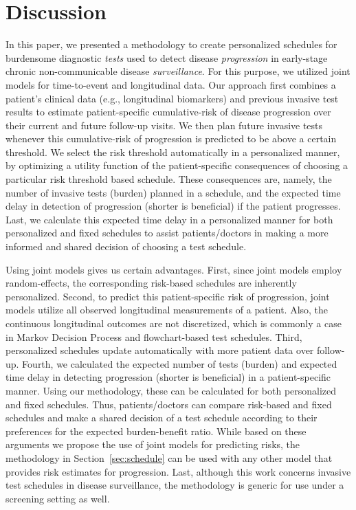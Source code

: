 \documentclass[AMA,STIX1COL]{WileyNJD-v2}
\begin{document}
\section{Discussion}
\label{sec:discussion}
In this paper, we presented a methodology to create personalized schedules for burdensome diagnostic \textit{tests} used to detect disease \textit{progression} in early-stage chronic non-communicable disease \textit{surveillance}. For this purpose, we utilized joint models for time-to-event and longitudinal data. Our approach first combines a patient's clinical data (e.g., longitudinal biomarkers) and previous invasive test results to estimate patient-specific cumulative-risk of disease progression over their current and future follow-up visits. We then plan future invasive tests whenever this cumulative-risk of progression is predicted to be above a certain threshold. We select the risk threshold automatically in a personalized manner, by optimizing a utility function of the patient-specific consequences of choosing a particular risk threshold based schedule. These consequences are, namely, the number of invasive tests (burden) planned in a schedule, and the expected time delay in detection of progression (shorter is beneficial) if the patient progresses. Last, we calculate this expected time delay in a personalized manner for both personalized and fixed schedules to assist patients/doctors in making a more informed and shared decision of choosing a test schedule.

Using joint models gives us certain advantages. First, since joint models employ random-effects, the corresponding risk-based schedules are inherently personalized. Second, to predict this patient-specific risk of progression, joint models utilize all observed longitudinal measurements of a patient. Also, the continuous longitudinal outcomes are not discretized, which is commonly a case in Markov Decision Process and flowchart-based test schedules. Third, personalized schedules update automatically with more patient data over follow-up. Fourth, we calculated the expected number of tests (burden) and expected time delay in detecting progression (shorter is beneficial) in a patient-specific manner. Using our methodology, these can be calculated for both personalized and fixed schedules. Thus, patients/doctors can compare risk-based and fixed schedules and make a shared decision of a test schedule according to their preferences for the expected burden-benefit ratio. While based on these arguments we propose the use of joint models for predicting risks, the methodology in Section~\ref{sec:schedule} can be used with any other model that provides risk estimates for progression. Last, although this work concerns invasive test schedules in disease surveillance, the methodology is generic for use under a screening setting as well.
\end{document}
